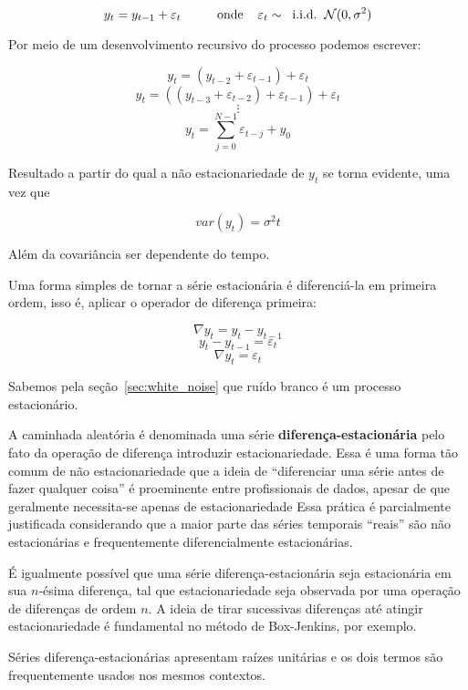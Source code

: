 $$  y_t = y_{t-1} + \varepsilon_t  \hspace{1cm}\text{onde} \hspace{.4cm}\varepsilon_t \sim \hspace{.2cm}\text{i.i.d.} \hspace{.2cm}\mathcal{N}(0, \sigma^2)$$

Por meio de um desenvolvimento recursivo do processo podemos escrever:

$$ y_t = (y_{t-2} + \varepsilon_{t-1}) + \varepsilon_{t} $$
$$ y_t = ((y_{t-3} + \varepsilon_{t-2}) + \varepsilon_{t-1}) + \varepsilon_{t} $$
$$ \vdots $$
$$ y_t = \sum_{j=0}^{N-1} \varepsilon_{t-j} + y_0$$
\vspace{1cm}

Resultado a partir do qual a não estacionariedade de $y_t$ se torna evidente,
uma vez que

$$ var(y_t) = \sigma^2 t $$

Além da covariância ser dependente do tempo.

Uma forma simples de tornar a série estacionária é diferenciá-la em primeira
ordem, isso é, aplicar o operador de diferença primeira:

$$ \nabla y_t = y_t - y_{t-1} $$
$$ y_t - y_{t-1} = \varepsilon_t$$
$$ \nabla y_t =  \varepsilon_t$$

Sabemos pela seção~\ref{sec:white_noise} que ruído branco é um processo
estacionário.

A caminhada aleatória é denominada uma série \textbf{diferença-estacionária}
pelo fato da operação de diferença introduzir estacionariedade. Essa é uma
forma tão comum de não estacionariedade que a ideia de ``diferenciar uma
série antes de fazer qualquer coisa'' é proeminente entre profissionais de
dados, apesar de que geralmente necessita-se apenas de estacionariedade
Essa prática é parcialmente justificada considerando que a maior
parte das séries temporais ``reais'' são não estacionárias e frequentemente
diferencialmente estacionárias.

É igualmente possível que uma série diferença-estacionária seja estacionária em
sua $n$-ésima diferença, tal que estacionariedade seja observada por uma
operação de diferenças de ordem $n$. A ideia de tirar sucessivas diferenças
até atingir estacionariedade é fundamental no método de Box-Jenkins, por
exemplo.

Séries diferença-estacionárias apresentam raízes unitárias e os dois termos são
frequentemente usados nos mesmos contextos.

